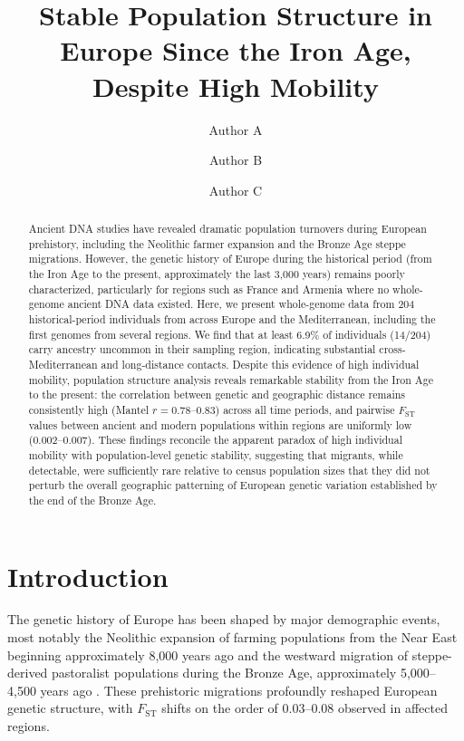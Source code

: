\documentclass[11pt]{article}
\title{Stable Population Structure in Europe Since the Iron Age, Despite High Mobility}
\author[1]{Author A}
\author[1,2]{Author B}
\author[2]{Author C}
\affil[1]{Department of Archaeogenetics, Max Planck Institute for Evolutionary Anthropology, Leipzig, Germany}
\affil[2]{Department of Human Genetics, University of Vienna, Vienna, Austria}
\date{}
\begin{document}
\maketitle

\begin{abstract}
Ancient DNA studies have revealed dramatic population turnovers during European prehistory, including the Neolithic farmer expansion and the Bronze Age steppe migrations. However, the genetic history of Europe during the historical period (from the Iron Age to the present, approximately the last 3,000 years) remains poorly characterized, particularly for regions such as France and Armenia where no whole-genome ancient DNA data existed. Here, we present whole-genome data from 204 historical-period individuals from across Europe and the Mediterranean, including the first genomes from several regions. We find that at least 6.9\% of individuals (14/204) carry ancestry uncommon in their sampling region, indicating substantial cross-Mediterranean and long-distance contacts. Despite this evidence of high individual mobility, population structure analysis reveals remarkable stability from the Iron Age to the present: the correlation between genetic and geographic distance remains consistently high (Mantel $r = 0.78$--$0.83$) across all time periods, and pairwise $F_\text{ST}$ values between ancient and modern populations within regions are uniformly low (0.002--0.007). These findings reconcile the apparent paradox of high individual mobility with population-level genetic stability, suggesting that migrants, while detectable, were sufficiently rare relative to census population sizes that they did not perturb the overall geographic patterning of European genetic variation established by the end of the Bronze Age.
\end{abstract}

\section{Introduction}

The genetic history of Europe has been shaped by major demographic events, most notably the Neolithic expansion of farming populations from the Near East beginning approximately 8,000 years ago and the westward migration of steppe-derived pastoralist populations during the Bronze Age, approximately 5,000--4,500 years ago \citep{haak2015massive, allentoft2015population}. These prehistoric migrations profoundly reshaped European genetic structure, with $F_\text{ST}$ shifts on the order of 0.03--0.08 observed in affected regions.
\end{document}
